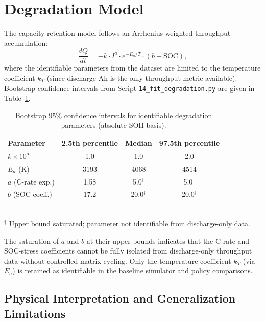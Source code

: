 \section{Degradation Model}

The capacity retention model follows an Arrhenius-weighted throughput
accumulation:
\begin{equation}
  \frac{dQ}{dt} = -k \cdot I^a \cdot e^{-E_a / T} \cdot (b + \mathrm{SOC}),
  \label{eq:degradation}
\end{equation}
where the identifiable parameters from the dataset are limited to the
temperature coefficient $k_T$ (since discharge Ah is the only
throughput metric available).  Bootstrap confidence intervals from
Script \texttt{14\_fit\_degradation.py} are given in
Table~\ref{tab:degradation_ci}.

\begin{table}[htbp]
  \centering
  \caption{Bootstrap 95\% confidence intervals for identifiable
  degradation parameters (absolute SOH basis).}
  \label{tab:degradation_ci}
  \begin{tabular}{lccc}
    \toprule
    \textbf{Parameter} & \textbf{2.5th percentile} &
    \textbf{Median} & \textbf{97.5th percentile} \\
    \midrule
    $k \times 10^5$   & 1.0  & 1.0  & 2.0  \\
    $E_a$ (K)         & 3193 & 4068 & 4514 \\
    $a$ (C-rate exp.) & 1.58 & 5.0$^\dagger$ & 5.0$^\dagger$ \\
    $b$ (SOC coeff.)  & 17.2 & 20.0$^\dagger$ & 20.0$^\dagger$ \\
    \bottomrule
  \end{tabular}
  \\\vspace{4pt}\small
  $^\dagger$ Upper bound saturated; parameter not identifiable from
  discharge-only data.
\end{table}

The saturation of $a$ and $b$ at their upper bounds indicates that
the C-rate and SOC-stress coefficients cannot be fully isolated from
discharge-only throughput data without controlled matrix cycling.
Only the temperature coefficient $k_T$ (via $E_a$) is retained as
identifiable in the baseline simulator and policy comparisons.

\subsection{Physical Interpretation and Generalization Limitations}

